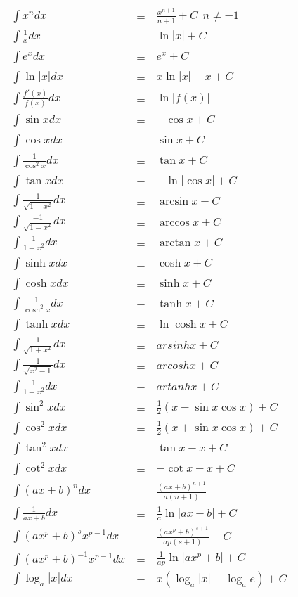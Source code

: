 \documentclass[german, 10pt, a4paper, twocolumn]{scrartcl}
\theoremstyle{definition}
\begin{document}
\footnotesize
\begin{tabular}{lcl}
 $\int x^n dx$ & = &				$\frac{x^{n+1}}{n+1}+C\:\:n\neq -1$\\
 $\int \frac{1}{x} dx$ & = &			$\ln |x| +C$\\
 $\int e^x dx$ & = &				$e^x +C$\\
 $\int \ln |x| dx$ & = &			$x\ln |x| -x +C$\\
 $\int \frac{f'(x)}{f(x)}dx$ & = &		$\ln|f(x)|$\\
 $\int \sin x dx$ & = &				$-\cos x +C$\\
 $\int \cos x dx$ & = &				$\sin x +C$\\
 $\int \frac{1}{\cos^2 x}dx$ & = &		$\tan x +C$\\
 $\int \tan x dx$ & = &				$-\ln|\cos x|+C$\\
 $\int \frac{1}{\sqrt{1-x^2}}dx$ & = &	$\arcsin x +C$\\
 $\int \frac{-1}{\sqrt{1-x^2}}dx$ & = &	$\arccos x +C$\\
 $\int \frac{1}{1+x^2}dx$ & = &			$\arctan x +C$\\
 $\int \sinh x dx$ & = &			$\cosh x +C$\\
 $\int \cosh x dx$ & = &			$\sinh x +C$\\
 $\int \frac{1}{\cosh^2 x}dx$ & = &		$\tanh x +C$\\
 $\int \tanh x dx$ & = &			$\ln\cosh x + C$\\
 $\int \frac{1}{\sqrt{1+x^2}}dx$ & = &		$arsinh x + C$\\
 $\int \frac{1}{\sqrt{x^2-1}}dx$ & = &		$arcosh x + C$\\
 $\int \frac{1}{1-x^2}dx$ & = &			$artanh x + C$\\
 $\int \sin^2 x dx$ & = &			$\frac{1}{2}(x-\sin x \cos x) +C$\\
 $\int \cos^2 x dx$ & = &			$\frac{1}{2}(x+\sin x \cos x) +C$\\
 $\int \tan^2 x dx$ & = &			$\tan x-x +C$\\
 $\int \cot^2 x dx$ & = &			$-\cot x-x +C$\\
 $\int (ax+b)^ndx$ & = &			$\frac{(ax+b)^{n+1}}{a(n+1)}$\\
 $\int \frac{1}{ax+b}dx$ & = &			$\frac{1}{a}\ln|ax+b| +C$\\
 $\int (ax^p+b)^s x^{p-1}dx$ & = &		$\frac{(ax^p+b)^{s+1}}{ap(s+1)} +C$\\
 $\int (ax^p+b)^{-1} x^{p-1}dx$ & = &		$\frac{1}{ap}\ln |ax^p+b| +C$\\
 $\int \log_a |x|dx$ & = &			$x(\log_a|x|-\log_a e) +C$\\

\end{tabular}
\end{document}
